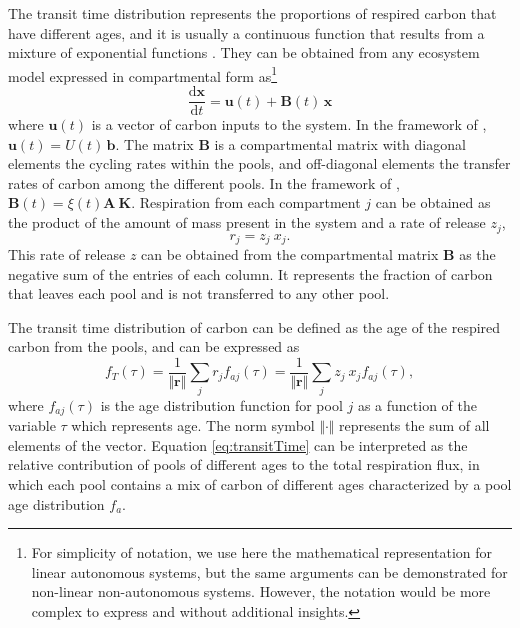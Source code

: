 \documentclass[bg, manuscript]{copernicus}
\begin{document}
The transit time distribution represents the proportions of respired carbon that have different ages, and it is usually a continuous function that results from a mixture of exponential functions \citep{Metzler2018MG}. They can be obtained from any ecosystem model expressed in compartmental form as\footnote{For simplicity of notation, we use here the mathematical representation for linear autonomous systems, but the same arguments can be demonstrated for non-linear non-autonomous systems. However, the notation would be more complex to express and without additional insights.}
\begin{equation}
\frac{\mathrm{d}\bm{x}}{\mathrm{d}t} = \bm{u}(t) + \mathbf{B}(t) \, \bm{x}
\end{equation}
where $\bm{u}(t)$ is a vector of carbon inputs to the system. In the framework of \citet{Luo2017}, $\bm{u}(t) = U(t)\, \bm{b}$. The matrix $\mathbf{B}$ is a compartmental matrix with diagonal elements the cycling rates within the pools, and off-diagonal elements the transfer rates of carbon among the different pools. In the framework of \citet{Luo2017}, $\mathbf{B}(t) = \xi(t) \mathbf{A \ K}$. Respiration from each compartment $j$ can be obtained as the product of the amount of mass present in the system and a rate of release $z_j$, 
\begin{equation}
r_j = z_j \ x_j.
\end{equation}
This rate of release $z$ can be obtained from the compartmental matrix $\mathbf{B}$ as the negative sum of the entries of each column. It represents the fraction of carbon that leaves each pool and is not transferred to any other pool.

The transit time distribution of carbon can be defined as the age of the respired carbon from the pools, and can be expressed as \citep{Metzler2018MG}
\begin{equation} \label{eq:transitTime}
f_T(\tau) = \frac{1}{\Vert \bm{r} \Vert} \sum_j r_j f_{aj}(\tau) =  \frac{1}{\Vert \bm{r} \Vert} \sum_j z_j \ x_j f_{aj}(\tau),
\end{equation}
where $f_{aj} (\tau)$ is the age distribution function for pool $j$ as a function of the variable $\tau$ which represents age. The norm symbol $\Vert \cdot \Vert$ represents the sum of all elements of the vector. Equation \ref{eq:transitTime} can be interpreted as the relative contribution of pools of different ages to the total respiration flux, in which each pool contains a mix of carbon of different ages characterized by a pool age distribution $f_a$. 
\end{document}
